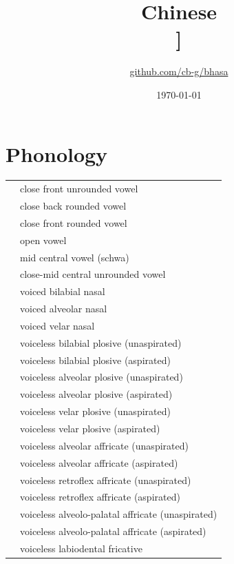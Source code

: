 \documentclass{article}
\title{Chinese\\\ipa{[\t{\:t\:s}UNw@n}]}
\author{\href{https://github.com/cb-g/bhasa}{github.com/cb-g/bhasa}}
\date{\today}
\begin{document}
\pagecolor{custom_bg}\color{custom_fg}
\maketitle\thispagestyle{empty}

\newpage\setcounter{page}{1}\section{Phonology}

\begin{xltabular}{\textwidth}{lL}
   & close front unrounded vowel \\
   & close back rounded vowel \\
   & close front rounded vowel \\
   & open vowel \\
   & mid central vowel (schwa) \\
  \ipa{\textrevepsilon} & close-mid central unrounded vowel \\
   & voiced bilabial nasal \\
   & voiced alveolar nasal \\
   & voiced velar nasal \\
   & voiceless bilabial plosive (unaspirated) \\
   & voiceless bilabial plosive (aspirated) \\
   & voiceless alveolar plosive (unaspirated) \\
   & voiceless alveolar plosive (aspirated) \\
   & voiceless velar plosive (unaspirated) \\
   & voiceless velar plosive (aspirated) \\
   & voiceless alveolar affricate (unaspirated) \\
   & voiceless alveolar affricate (aspirated) \\
   & voiceless retroflex affricate (unaspirated) \\
   & voiceless retroflex affricate (aspirated) \\
   & voiceless alveolo-palatal affricate (unaspirated) \\
   & voiceless alveolo-palatal affricate (aspirated) \\
   & voiceless labiodental fricative \\

\end{xltabular}
\end{document}
